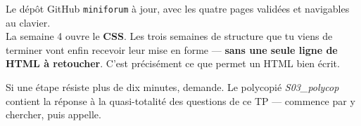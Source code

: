 \documentclass[a4paper,11pt]{article}
\begin{document}
\vspace{6pt}
\begin{tcolorbox}[attention, title={À rendre avant la semaine 4}]
Le dépôt GitHub \texttt{miniforum} à jour, avec les quatre pages validées et navigables au clavier.\\[4pt]
La semaine 4 ouvre le \textbf{CSS}. Les trois semaines de structure que tu viens de terminer vont enfin recevoir leur mise en forme --- \textbf{sans une seule ligne de HTML à retoucher}. C'est précisément ce que permet un HTML bien écrit.
\end{tcolorbox}

\vspace{6pt}
\begin{tcolorbox}[astuce, title={Bloqué ?}]
Si une étape résiste plus de dix minutes, demande. Le polycopié \textit{S03\_polycop} contient la réponse à la quasi-totalité des questions de ce TP --- commence par y chercher, puis appelle.
\end{tcolorbox}
\end{document}
